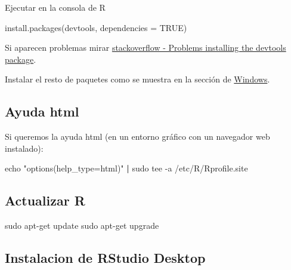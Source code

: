 \documentclass[
]{book}
\newenvironment{Shaded}{\begin{snugshade}}{\end{snugshade}}
\newcommand{\AttributeTok}[1]{\textcolor[rgb]{0.77,0.63,0.00}{#1}}
\newcommand{\BuiltInTok}[1]{#1}
\newcommand{\ConstantTok}[1]{\textcolor[rgb]{0.00,0.00,0.00}{#1}}
\newcommand{\FunctionTok}[1]{\textcolor[rgb]{0.00,0.00,0.00}{#1}}
\newcommand{\KeywordTok}[1]{\textcolor[rgb]{0.13,0.29,0.53}{\textbf{#1}}}
\newcommand{\NormalTok}[1]{#1}
\newcommand{\StringTok}[1]{\textcolor[rgb]{0.31,0.60,0.02}{#1}}
\theoremstyle{break}
\theoremstyle{nonumberplain}
\begin{document}
Ejecutar en la consola de R

\begin{Shaded}
\begin{Highlighting}[]
\FunctionTok{install.packages}\NormalTok{(}\StringTok{\textquotesingle{}devtools\textquotesingle{}}\NormalTok{, }\AttributeTok{dependencies =} \ConstantTok{TRUE}\NormalTok{)}
\end{Highlighting}
\end{Shaded}

Si aparecen problemas mirar \href{http://stackoverflow.com/a/20924082}{stackoverflow - Problems installing the devtools package}.

Instalar el resto de paquetes como se muestra en la sección de \protect\hyperlink{paquetes-win}{Windows}.

\hypertarget{ayuda-html}{%
\subsection{Ayuda html}\label{ayuda-html}}

Si queremos la ayuda html (en un entorno gráfico con un navegador web instalado):

\begin{Shaded}
\begin{Highlighting}[]
\BuiltInTok{echo} \StringTok{"options(help\_type=\textquotesingle{}html\textquotesingle{})"} \KeywordTok{|} \FunctionTok{sudo}\NormalTok{ tee }\AttributeTok{{-}a}\NormalTok{ /etc/R/Rprofile.site}
\end{Highlighting}
\end{Shaded}

\hypertarget{actualizar-r}{%
\subsection{Actualizar R}\label{actualizar-r}}

\begin{Shaded}
\begin{Highlighting}[]
\FunctionTok{sudo}\NormalTok{ apt{-}get update}
\FunctionTok{sudo}\NormalTok{ apt{-}get upgrade}
\end{Highlighting}
\end{Shaded}

\hypertarget{instalacion-de-rstudio-desktop}{%
\subsection{Instalacion de RStudio Desktop}\label{instalacion-de-rstudio-desktop}}
\end{document}
